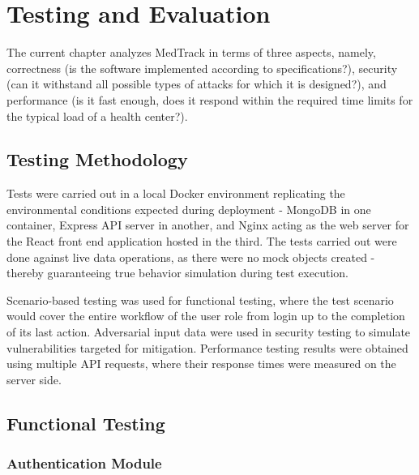 \chapter{Testing and Evaluation}

The current chapter analyzes MedTrack in terms of three aspects, namely, correctness (is the software implemented according to specifications?), security (can it withstand all possible types of attacks for which it is designed?), and performance (is it fast enough, does it respond within the required time limits for the typical load of a health center?).

\section{Testing Methodology}

Tests were carried out in a local Docker environment replicating the
environmental conditions expected during deployment - MongoDB in one
container, Express API server in another, and Nginx acting as the
web server for the React front end application hosted in the third.
The tests carried out were done against live data operations, as there
were no mock objects created - thereby guaranteeing true behavior
simulation during test execution.

Scenario-based testing was used for functional testing, where the test
scenario would cover the entire workflow of the user role from login
up to the completion of its last action. Adversarial input data were
used in security testing to simulate vulnerabilities targeted for
mitigation. Performance testing results were obtained using multiple API
requests, where their response times were measured on the server side.

\section{Functional Testing}

\subsection{Authentication Module}

